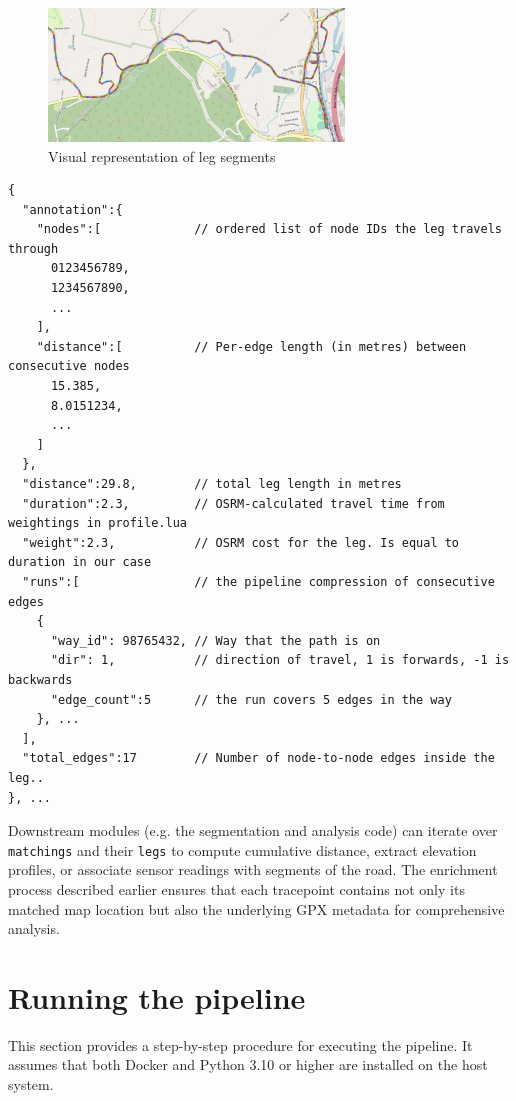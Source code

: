 \documentclass[11pt,a4paper]{article}
\begin{document}
\begin{figure}
	\centering
	\includegraphics[width=0.7\textwidth]{legs.png}
	\caption{Visual representation of leg segments}
	\label{fig:legs}
\end{figure}


\begin{verbatim}
{
  "annotation":{ 
    "nodes":[             // ordered list of node IDs the leg travels through
      0123456789,          
      1234567890,
      ...
    ],
    "distance":[          // Per-edge length (in metres) between consecutive nodes
      15.385,
      8.0151234,
      ...
    ]
  },
  "distance":29.8,        // total leg length in metres 
  "duration":2.3,         // OSRM-calculated travel time from weightings in profile.lua
  "weight":2.3,           // OSRM cost for the leg. Is equal to duration in our case 
  "runs":[                // the pipeline compression of consecutive edges
    {
      "way_id": 98765432, // Way that the path is on
      "dir": 1,           // direction of travel, 1 is forwards, -1 is backwards
      "edge_count":5      // the run covers 5 edges in the way
    }, ...
  ],
  "total_edges":17        // Number of node-to-node edges inside the leg..
}, ...
\end{verbatim}


Downstream modules (e.g. the segmentation and analysis code) can iterate over \texttt{matchings} and their \texttt{legs} to compute cumulative distance, extract elevation profiles, or associate sensor readings with segments of the road.  The enrichment process described earlier ensures that each tracepoint contains not only its matched map location but also the underlying GPX metadata for comprehensive analysis.

\section{Running the pipeline}
This section provides a step-by-step procedure for executing the pipeline.  It assumes that both Docker and Python 3.10 or higher are installed on the host system.
\end{document}
